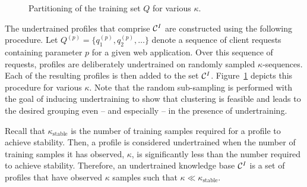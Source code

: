 \begin{figure}[t]
  \centering
  \caption{Partitioning of the training set $Q$ for various $\kappa$.}
  \label{fig:slicing}
\end{figure}

The undertrained profiles that comprise $\mathcal{C}^I$ are constructed using
the following procedure.  Let
$Q^{\left(p\right)}=\{q_1^{\left(p\right)},q_2^{\left(p\right)},\ldots\}$
denote a sequence of client requests containing parameter $p$ for a
given web application.  Over this sequence of requests, profiles are
deliberately undertrained on randomly sampled $\kappa$-sequences.
Each of the resulting profiles is then added to the set $\mathcal{C}^I$.
Figure~\ref{fig:slicing} depicts this procedure for various $\kappa$.
Note that the random sub-sampling is performed with the goal of
inducing undertraining to show that clustering is feasible and leads
to the desired grouping even -- and especially -- in the presence of
undertraining.

Recall that $\kappa_{\text{stable}}$ is the number of training samples required for a profile to achieve stability.  Then, a profile is considered undertrained when the number of training samples it has observed, $\kappa$, is significantly less than the number required to achieve stability.  Therefore, an undertrained knowledge base $\mathcal{C}^I$ is a set of profiles that have observed $\kappa$ samples such that $\kappa\ll\kappa_{\text{stable}}$.

